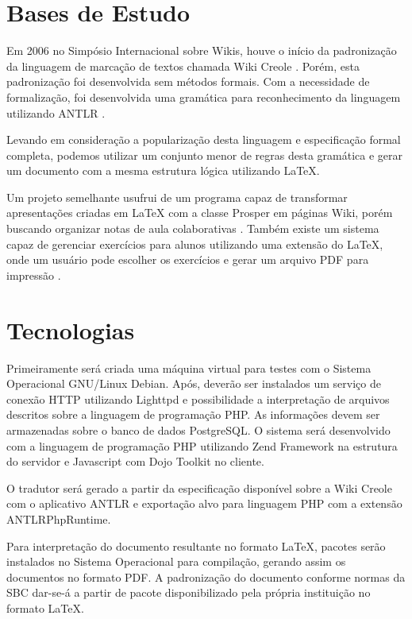 \documentclass{article}
\begin{document}
\section{Bases de Estudo}
\label{sec:bases-estudo}

Em 2006 no Simpósio Internacional sobre Wikis, houve o início da padronização da
linguagem de marcação de textos chamada Wiki Creole \cite{a21-junghans}. Porém,
esta padronização foi desenvolvida sem métodos formais. Com a necessidade de
formalização, foi desenvolvida uma gramática para reconhecimento da linguagem
utilizando ANTLR \cite{a4-junghans}.

Levando em consideração a popularização desta linguagem e especificação formal
completa, podemos utilizar um conjunto menor de regras desta gramática e gerar
um documento com a mesma estrutura lógica utilizando \LaTeX{}.

Um projeto semelhante usufrui de um programa capaz de transformar apresentações
criadas em \LaTeX{} com a classe Prosper em páginas Wiki, porém buscando
organizar notas de aula colaborativas \cite{p267-oneill}. Também existe um
sistema capaz de gerenciar exercícios para alunos utilizando uma extensão do
\LaTeX{}, onde um usuário pode escolher os exercícios e gerar um arquivo PDF
para impressão \cite{p161-gregorio-rodriguez}.

\section{Tecnologias}
\label{sec:tecnologias}

Primeiramente será criada uma máquina virtual para testes com o Sistema
Operacional GNU/Linux Debian. Após, deverão ser instalados um serviço de conexão
HTTP utilizando Lighttpd e possibilidade a interpretação de arquivos descritos
sobre a linguagem de programação PHP. As informações devem ser armazenadas sobre
o banco de dados PostgreSQL. O sistema será desenvolvido com a linguagem de
programação PHP utilizando Zend Framework na estrutura do servidor e Javascript
com Dojo Toolkit no cliente.

O tradutor será gerado a partir da especificação disponível sobre a Wiki Creole
com o aplicativo ANTLR e exportação alvo para linguagem PHP com a extensão
ANTLRPhpRuntime.

Para interpretação do documento resultante no formato \LaTeX{}, pacotes serão
instalados no Sistema Operacional para compilação, gerando assim os documentos
no formato PDF. A padronização do documento conforme normas da SBC dar-se-á a
partir de pacote disponibilizado pela própria instituição no formato \LaTeX{}.
\end{document}
